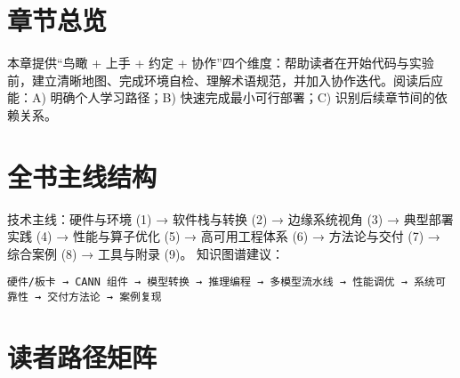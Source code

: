 \section{章节总览}\label{ux7ae0ux8282ux603bux89c8}

本章提供``鸟瞰 + 上手 + 约定 +
协作''四个维度：帮助读者在开始代码与实验前，建立清晰地图、完成环境自检、理解术语规范，并加入协作迭代。阅读后应能：A)
明确个人学习路径；B) 快速完成最小可行部署；C) 识别后续章节间的依赖关系。

\section{全书主线结构}\label{ux5168ux4e66ux4e3bux7ebfux7ed3ux6784}

技术主线：硬件与环境 (1) → 软件栈与转换 (2) → 边缘系统视角 (3) →
典型部署实践 (4) → 性能与算子优化 (5) → 高可用工程体系 (6) →
方法论与交付 (7) → 综合案例 (8) → 工具与附录 (9)。 知识图谱建议：

\begin{lstlisting}
硬件/板卡 → CANN 组件 → 模型转换 → 推理编程 → 多模型流水线 → 性能调优 → 系统可靠性 → 交付方法论 → 案例复现
\end{lstlisting}

\section{读者路径矩阵}\label{ux8bfbux8005ux8defux5f84ux77e9ux9635}

